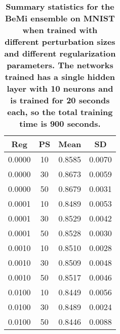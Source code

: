 \begin{center}
\begin{table}[H]
\centering
\begin{tabular}{|c|c|c|c|}
  \hline
Reg & PS & Mean & SD \\ 
  \hline
0.0000 &  10 & 0.8585 & 0.0070 \\ 
   \hline
0.0000 &  30 & 0.8673 & 0.0059 \\ 
   \hline
0.0000 &  50 & 0.8679 & 0.0031 \\ 
   \hline
0.0001 &  10 & 0.8489 & 0.0053 \\ 
   \hline
0.0001 &  30 & 0.8529 & 0.0042 \\ 
   \hline
0.0001 &  50 & 0.8528 & 0.0030 \\ 
   \hline
0.0010 &  10 & 0.8510 & 0.0028 \\ 
   \hline
0.0010 &  30 & 0.8509 & 0.0048 \\ 
   \hline
0.0010 &  50 & 0.8517 & 0.0046 \\ 
   \hline
0.0100 &  10 & 0.8449 & 0.0056 \\ 
   \hline
0.0100 &  30 & 0.8489 & 0.0024 \\ 
   \hline
0.0100 &  50 & 0.8446 & 0.0088 \\ 
   \hline
\end{tabular}
\caption{\small{\textbf{Summary statistics for the BeMi ensemble on MNIST when trained with different perturbation sizes and 
          different regularization parameters. The networks trained has a single hidden layer with 10 neurons and is trained for
          20 seconds each, so the total training time is 900 seconds.}}} 
\label{BEMI_TNN}
\end{table}

\end{center}
